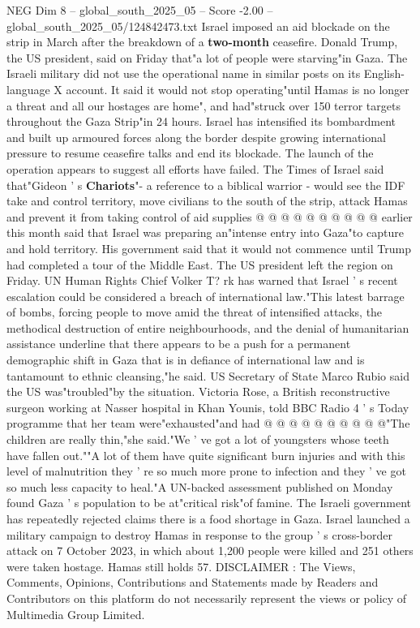 \begin{textsample}{NEG Dim 8 – global\_south\_2025\_05 – Score -2.00 – global\_south\_2025\_05/124842473.txt}  \label{ex:f8_neg_013}
Israel imposed an aid blockade on the strip in March after the breakdown of a \textbf{two-month} ceasefire.
Donald Trump, the US president, said on Friday that"a lot of people were starving"in Gaza.
The Israeli military did not use the operational name in similar posts on its English-language X account.
It said it would not stop operating"until Hamas is no longer a threat and all our hostages are home", and had"struck over 150 terror targets throughout the Gaza Strip"in 24 hours.
Israel has intensified its bombardment and built up armoured forces along the border despite growing international pressure to resume ceasefire talks and end its blockade.
The launch of the operation appears to suggest all efforts have failed.
The Times of Israel said that"Gideon ' s \textbf{Chariots}"- a reference to a biblical warrior - would see the IDF take and control territory, move civilians to the south of the strip, attack Hamas and prevent it from taking control of aid supplies @ @ @ @ @ @ @ @ @ @ earlier this month said that Israel was preparing an"intense entry into Gaza"to capture and hold territory.
His government said that it would not commence until Trump had completed a tour of the Middle East.
The US president left the region on Friday.
UN Human Rights Chief Volker T? rk has warned that Israel ' s recent escalation could be considered a breach of international law."This latest barrage of bombs, forcing people to move amid the threat of intensified attacks, the methodical destruction of entire neighbourhoods, and the denial of humanitarian assistance underline that there appears to be a push for a permanent demographic shift in Gaza that is in defiance of international law and is tantamount to ethnic cleansing,"he said.
US Secretary of State Marco Rubio said the US was"troubled"by the situation.
Victoria Rose, a British reconstructive surgeon working at Nasser hospital in Khan Younis, told BBC Radio 4 ' s Today programme that her team were"exhausted"and had @ @ @ @ @ @ @ @ @ @"The children are really thin,"she said."We ' ve got a lot of youngsters whose teeth have fallen out.""A lot of them have quite significant burn injuries and with this level of malnutrition they ' re so much more prone to infection and they ' ve got so much less capacity to heal."A UN-backed assessment published on Monday found Gaza ' s population to be at"critical risk"of famine.
The Israeli government has repeatedly rejected claims there is a food shortage in Gaza.
Israel launched a military campaign to destroy Hamas in response to the group ' s cross-border attack on 7 October 2023, in which about 1,200 people were killed and 251 others were taken hostage.
Hamas still holds 57.
DISCLAIMER : The Views, Comments, Opinions, Contributions and Statements made by Readers and Contributors on this platform do not necessarily represent the views or policy of Multimedia Group Limited.

\end{textsample}
